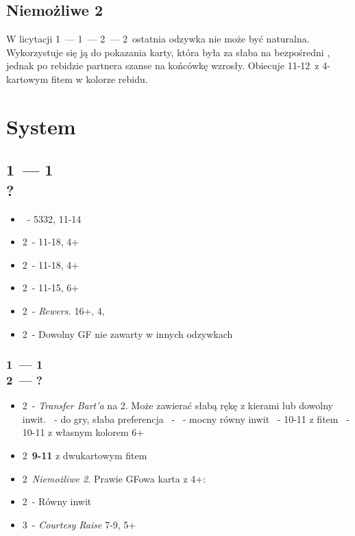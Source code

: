 \documentclass[12pt, a4paper]{article}
\begin{document}
    \subsection{Niemożliwe 2\spades}
    W licytacji 1\hearts\ --- 1\nt\ --- 2\minor\ --- 2\spades\ ostatnia odzywka nie może być naturalna.
    Wykorzystuje się ją do pokazania karty, która była za słaba na bezpośredni \gf, jednak
    po rebidzie partnera szanse na końcówkę wzrosły.
    Obiecuje 11-12\hcp\ z 4-kartowym fitem w kolorze rebidu.

    \pagebreak
    \section{System}
    \subsection{1\hearts\ --- 1\ntx \\ ?}
    \begin{itemize}
        \item \pass\ - 5332, 11-14
        \item 2\clubs\ - 11-18, 4+\clubs
        \item 2\diams\ - 11-18, 4+\diams 
        \item 2\hearts\ - 11-15, 6+\hearts 
        \item 2\spades\ - \emph{Rewers.} 16+, 4\spades, \fonce 
        \item 2\nt\ - Dowolny GF nie zawarty w innych odzywkach \gf 
    \end{itemize}

    \subsubsection{1\hearts\ --- 1\ntx \\ 2\clubs\ --- ?}
    \begin{itemize}
        \item 2\diams\ - \emph{Transfer Bart'a} na 2\hearts.
        Może zawierać słabą rękę z kierami lub dowolny inwit.
        \subitem \pass\ - do gry, słaba preferencja
        \spades\ - 
        \nt\ - mocny równy inwit
        \clubs\ - 10-11 z fitem \clubs
        \diams\ - 10-11 z własnym kolorem 6+
        \item 2\hearts\ \textbf{9-11} z dwukartowym fitem
        \item 2\spades\ \emph{Niemożliwe 2\spades.} Prawie GFowa karta z 4+\clubs:
        \item 2\nt\ - Równy inwit
        \item 3\clubs\ - \emph{Courtesy Raise} 7-9, 5+\clubs
    \end{itemize}
\end{document}

